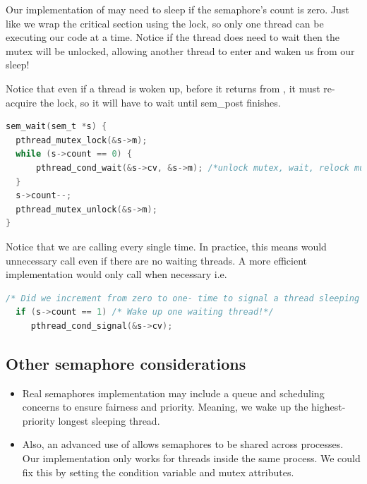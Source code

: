 Our implementation of  may need to sleep if the semaphore's count is zero.
Just like  we wrap the critical section using the lock, so only one thread can be executing our code at a time.
Notice if the thread does need to wait then the mutex will be unlocked, allowing another thread to enter  and waken us from our sleep!

Notice that even if a thread is woken up, before it returns from , it must re-acquire the lock, so it will have to wait until sem\_post finishes.

\begin{lstlisting}[language=C]
sem_wait(sem_t *s) {
  pthread_mutex_lock(&s->m);
  while (s->count == 0) {
      pthread_cond_wait(&s->cv, &s->m); /*unlock mutex, wait, relock mutex*/
  }
  s->count--;
  pthread_mutex_unlock(&s->m);
}
\end{lstlisting}

Notice that we are calling  every single time.
In practice, this means  would unnecessary call  even if there are no waiting threads.
A more efficient implementation would only call  when necessary i.e.

\begin{lstlisting}[language=C]
  /* Did we increment from zero to one- time to signal a thread sleeping inside sem_post */
  if (s->count == 1) /* Wake up one waiting thread!*/
     pthread_cond_signal(&s->cv);
\end{lstlisting}

\subsection{Other semaphore considerations}

\begin{itemize}
\tightlist
\item
  Real semaphores implementation may include a queue and scheduling concerns to ensure fairness and priority.
  Meaning, we wake up the highest-priority longest sleeping thread.
\item
  Also, an advanced use of  allows semaphores to be shared across processes.
  Our implementation only works for threads inside the same process.
  We could fix this by setting the condition variable and mutex attributes.
\end{itemize}

